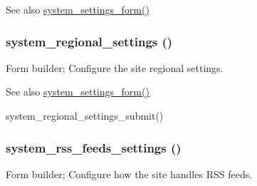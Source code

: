 \begin{DoxySeeAlso}{See also}
\hyperlink{group__forms_ga6fb270d34465d846cd4659a85d3e40c8}{system\_\-settings\_\-form()} 
\end{DoxySeeAlso}
\hypertarget{group__forms_gac25147c52d45f3bfa503aaac07287826}{
\subsubsection[{system\_\-regional\_\-settings}]{\setlength{\rightskip}{0pt plus 5cm}system\_\-regional\_\-settings ()}}
\label{group__forms_gac25147c52d45f3bfa503aaac07287826}
Form builder; Configure the site regional settings.

\begin{DoxySeeAlso}{See also}
\hyperlink{group__forms_ga6fb270d34465d846cd4659a85d3e40c8}{system\_\-settings\_\-form()} 

system\_\-regional\_\-settings\_\-submit() 
\end{DoxySeeAlso}
\hypertarget{group__forms_gacff83234fa52dbaaf85c122bd300a374}{
\subsubsection[{system\_\-rss\_\-feeds\_\-settings}]{\setlength{\rightskip}{0pt plus 5cm}system\_\-rss\_\-feeds\_\-settings ()}}
\label{group__forms_gacff83234fa52dbaaf85c122bd300a374}
Form builder; Configure how the site handles RSS feeds.

